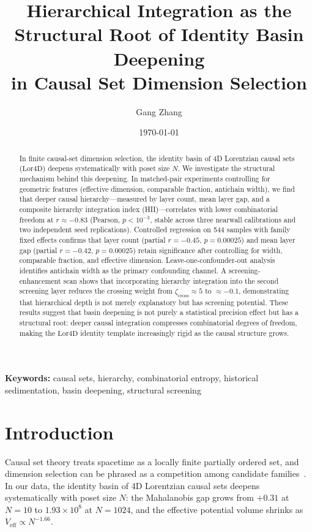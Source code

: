\documentclass[12pt,a4paper]{article}
\title{Hierarchical Integration as the Structural Root of Identity Basin Deepening\\
  in Causal Set Dimension Selection}
\author{Gang Zhang}
\date{\today}
\newcommand{\Lor}{\mathrm{Lor4D}}
\begin{document}
\maketitle

\begin{abstract}
In finite causal-set dimension selection, the identity basin of 4D Lorentzian
causal sets ($\Lor$) deepens systematically with poset size $N$.
We investigate the structural mechanism behind this deepening.
In matched-pair experiments controlling for geometric features (effective
dimension, comparable fraction, antichain width), we find that deeper causal
hierarchy---measured by layer count, mean layer gap, and a composite hierarchy
integration index (HII)---correlates with lower combinatorial freedom at
$r\approx -0.83$ (Pearson, $p<10^{-3}$, stable across three nearwall
calibrations and two independent seed replications).
Controlled regression on 544 samples with family fixed effects confirms that
layer count (partial $r=-0.45$, $p=0.00025$) and mean layer gap (partial
$r=-0.42$, $p=0.00025$) retain significance after controlling for width,
comparable fraction, and effective dimension.
Leave-one-confounder-out analysis identifies antichain width as the primary
confounding channel.
A screening-enhancement scan shows that incorporating hierarchy integration
into the second screening layer reduces the crossing weight from
$\zeta_{\mathrm{cross}}\approx 5$ to $\approx -0.1$, demonstrating that
hierarchical depth is not merely explanatory but has screening potential.
These results suggest that basin deepening is not purely a statistical precision
effect but has a structural root: deeper causal integration compresses
combinatorial degrees of freedom, making the $\Lor$ identity template
increasingly rigid as the causal structure grows.
\end{abstract}

\noindent\textbf{Keywords:}
causal sets, hierarchy, combinatorial entropy, historical sedimentation,
basin deepening, structural screening

\section{Introduction}

Causal set theory treats spacetime as a locally finite partially ordered set,
and dimension selection can be phrased as a competition among candidate
families~\cite{Surya2019}.
In our data, the identity basin of 4D Lorentzian causal sets deepens
systematically with poset size $N$: the Mahalanobis gap grows from $+0.31$ at
$N=10$ to $1.93\times 10^8$ at $N=1024$, and the effective potential volume
shrinks as $V_{\mathrm{eff}}\propto N^{-1.66}$.
\end{document}
